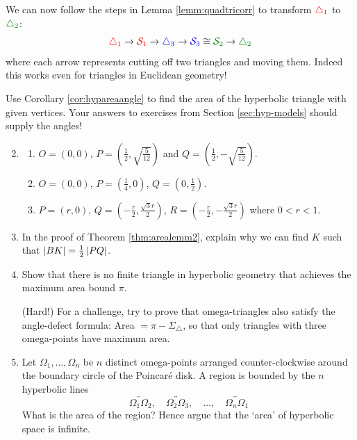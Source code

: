 We can now follow the steps in Lemma \ref{lemm:quadtricorr} to transform $\textcolor{red}{\triangle_1}$ to $\textcolor{Green}{\triangle_2}$:
\[
	\textcolor{red}{\triangle_1}\to \textcolor{red}{\cS_1}\to \textcolor{blue}{\triangle_3}\to \textcolor{blue}{\cS_3}\cong \textcolor{Green}{\cS_2}\to \textcolor{Green}{\triangle_2}
\]
where each arrow represents cutting off two triangles and moving them. Indeed this works even for triangles in Euclidean geometry!

\goodbreak


\begin{exercises}
	\exstart Use Corollary \ref{cor:hypareaangle} to find the area of the hyperbolic triangle with given vertices. Your answers to exercises from Section \ref{sec:hyp-models} should supply the angles!
	\begin{enumerate}\setcounter{enumi}{1}
	  \item[]\begin{enumerate}
	    \item $O=(0,0)$, $P=(\frac 12,\sqrt{\frac 5{12}})$ and $Q=(\frac 12,-\sqrt{\frac 5{12}})$.
	    \item $O=(0,0)$, $P=(\frac 14,0)$, $Q=(0,\frac 12)$.
	    \item $P=(r,0)$, $Q=\left(-\frac r2,\frac{\sqrt{3}r}2\right)$, $R=\left(-\frac r2,-\frac{\sqrt{3}r}2\right)$ where $0<r<1$.
		\end{enumerate}
		
		\item In the proof of Theorem \ref{thm:arealemm2}, explain why we can find $K$ such that $\left| BK\right|=\frac 12\left| PQ\right|$. 
		
   
	  \item Show that there is no finite triangle in hyperbolic geometry that achieves the maximum area bound $\pi$.\par
	  (Hard!) For a challenge, try to prove that omega-triangles also satisfy the angle-defect formula: Area $=\pi-\Sigma_\triangle$, so that only triangles with three omega-points have maximum area.
	
		\item Let $\Omega_1,\ldots,\Omega_n$ be $n$ distinct omega-points arranged counter-clockwise around the boundary circle of the Poincaré disk. A region is bounded by the $n$ hyperbolic lines
		\[
			\overleftrightarrow{\Omega_1\Omega_2},\quad \overleftrightarrow{\Omega_2\Omega_3},\quad\ldots,\quad\overleftrightarrow{\Omega_n\Omega_1}
		\]
		What is the area of the region? Hence argue that the `area' of hyperbolic space is infinite.
	  

\end{enumerate}
\end{exercises}
